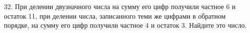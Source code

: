 32. При делении двузначного числа на сумму его цифр получили частное 6 и остаток 11, при делении числа, записанного теми же цифрами в обратном порядке, на сумму его цифр получили частное 4 и остаток 3. Найдите это число.\\
